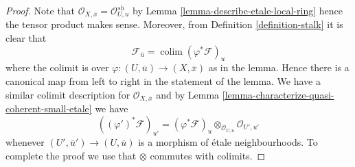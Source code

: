 \documentclass[10pt,a4paper]{amsart}
\theoremstyle{plain}
\theoremstyle{definition}
\theoremstyle{remark}
\numberwithin{equation}{subsection}
\def\colim{\mathop{\mathrm{colim}}\nolimits}
\begin{document}
\begin{proof}
Note that $\mathcal{O}_{X, \overline{x}} = \mathcal{O}_{U, u}^{sh}$ by
Lemma \ref{lemma-describe-etale-local-ring}
hence the tensor product makes sense. Moreover, from
Definition \ref{definition-stalk}
it is clear that
$$
\mathcal{F}_{\overline{u}} = \colim (\varphi^*\mathcal{F})_u
$$
where the colimit is over $\varphi : (U, \overline{u}) \to (X, \overline{x})$
as in the lemma. Hence there is a canonical map from left to right in
the statement of the lemma. We have a similar colimit description for
$\mathcal{O}_{X, \overline{x}}$
and by
Lemma \ref{lemma-characterize-quasi-coherent-small-etale}
we have
$$
((\varphi')^*\mathcal{F})_{u'} =
(\varphi^*\mathcal{F})_u \otimes_{\mathcal{O}_{U, u}} \mathcal{O}_{U', u'}
$$
whenever $(U', \overline{u}') \to (U, \overline{u})$ is a morphism of
\'etale neighbourhoods. To complete the proof we use that
$\otimes$ commutes with colimits.
\end{proof}
\end{document}
